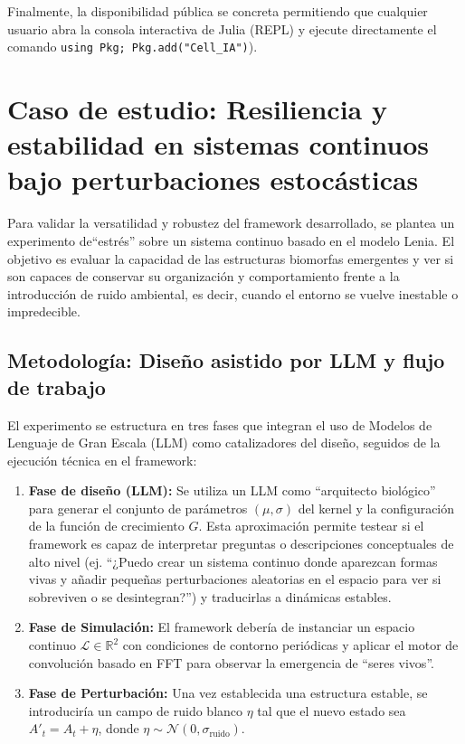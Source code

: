 \documentclass[runningheads]{llncs}
\begin{document}
Finalmente, la disponibilidad pública se concreta permitiendo que cualquier usuario abra la consola interactiva de Julia (REPL) y ejecute directamente el comando \texttt{using Pkg; Pkg.add("Cell\_IA")}).

\section{Caso de estudio: Resiliencia y estabilidad en sistemas continuos bajo perturbaciones estocásticas}

Para validar la versatilidad y robustez del framework desarrollado, se plantea un experimento de``estrés'' sobre un sistema continuo basado en el modelo Lenia. El objetivo es evaluar la capacidad de las estructuras biomorfas emergentes y ver si son capaces de conservar su organización y comportamiento frente a la introducción de ruido ambiental, es decir, cuando el entorno se vuelve inestable o impredecible.

\subsection{Metodología: Diseño asistido por LLM y flujo de trabajo}
El experimento se estructura en tres fases que integran el uso de Modelos de Lenguaje de Gran Escala (LLM) como catalizadores del diseño, seguidos de la ejecución técnica en el framework:

\begin{enumerate}
    \item \textbf{Fase de diseño (LLM):} Se utiliza un LLM como ``arquitecto biológico'' para generar el conjunto de parámetros $(\mu, \sigma)$ del kernel y la configuración de la función de crecimiento $G$. Esta aproximación permite testear si el framework es capaz de interpretar preguntas o descripciones conceptuales de alto nivel (ej. ``¿Puedo crear un sistema continuo donde aparezcan formas vivas y añadir pequeñas perturbaciones aleatorias en el espacio para ver si sobreviven o se desintegran?'') y traducirlas a dinámicas estables.
    \item \textbf{Fase de Simulación:} El framework debería de instanciar un espacio continuo $\mathcal{L} \in \mathbb{R}^2$ con condiciones de contorno periódicas y aplicar el motor de convolución basado en FFT para observar la emergencia de ``seres vivos''.
    \item \textbf{Fase de Perturbación:} Una vez establecida una estructura estable, se introduciría un campo de ruido blanco $\eta$ tal que el nuevo estado sea $A'_{t} = A_{t} + \eta$, donde $\eta \sim \mathcal{N}(0, \sigma_{\text{ruido}})$.
\end{enumerate}
\end{document}
